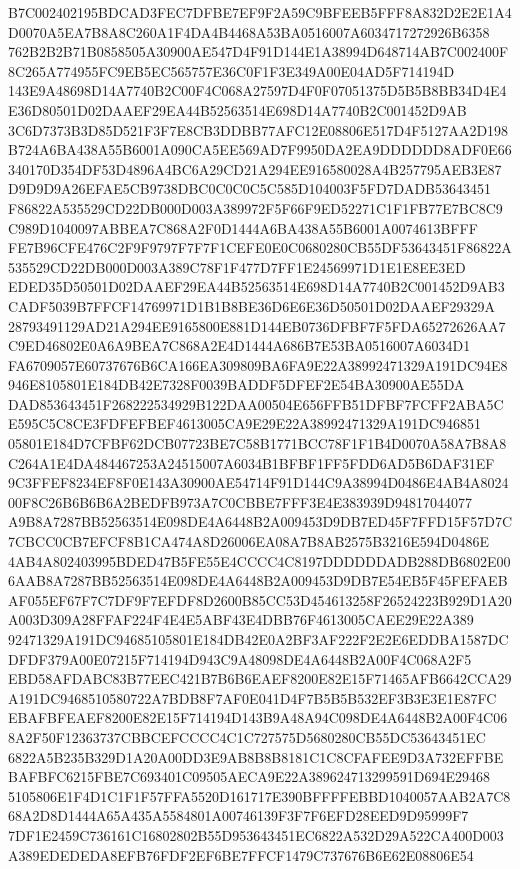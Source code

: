 \documentclass[UTF8,fontset=fandol,zihao=-4,a4paper]{ctexart}
\begin{document}
{{B7C002402195BDCAD3FEC7DFBE7EF9F2A59C9BFEEB5FFF8A832D2E2E1A4D0070A5EA7B8A8C260A1F4DA4B4468A53BA0516007A6034717272926B6358
762B2B2B71B0858505A30900AE547D4F91D144E1A38994D648714AB7C002400F8C265A774955FC9EB5EC565757E36C0F1F3E349A00E04AD5F714194D
143E9A48698D14A7740B2C00F4C068A27597D4F0F07051375D5B5B8BB34D4E4E36D80501D02DAAEF29EA44B52563514E698D14A7740B2C001452D9AB
3C6D7373B3D85D521F3F7E8CB3DDBB77AFC12E08806E517D4F5127AA2D198B724A6BA438A55B6001A090CA5EE569AD7F9950DA2EA9DDDDDD8ADF0E66
340170D354DF53D4896A4BC6A29CD21A294EE916580028A4B257795AEB3E87D9D9D9A26EFAE5CB9738DBC0C0C0C5C585D104003F5FD7DADB53643451
F86822A535529CD22DB000D003A389972F5F66F9ED52271C1F1FB77E7BC8C9C989D1040097ABBEA7C868A2F0D1444A6BA438A55B6001A0074613BFFF
FE7B96CFE476C2F9F9797F7F7F1CEFE0E0C0680280CB55DF53643451F86822A535529CD22DB000D003A389C78F1F477D7FF1E24569971D1E1E8EE3ED
EDED35D50501D02DAAEF29EA44B52563514E698D14A7740B2C001452D9AB3CADF5039B7FFCF14769971D1B1B8BE36D6E6E36D50501D02DAAEF29329A
28793491129AD21A294EE9165800E881D144EB0736DFBF7F5FDA65272626AA7C9ED46802E0A6A9BEA7C868A2E4D1444A686B7E53BA0516007A6034D1
FA6709057E60737676B6CA166EA309809BA6FA9E22A38992471329A191DC94E8946E8105801E184DB42E7328F0039BADDF5DFEF2E54BA30900AE55DA
DAD853643451F268222534929B122DAA00504E656FFB51DFBF7FCFF2ABA5CE595C5C8CE3FDFEFBEF4613005CA9E29E22A38992471329A191DC946851
05801E184D7CFBF62DCB07723BE7C58B1771BCC78F1F1B4D0070A58A7B8A8C264A1E4DA484467253A24515007A6034B1BFBF1FF5FDD6AD5B6DAF31EF
9C3FFEF8234EF8F0E143A30900AE54714F91D144C9A38994D0486E4AB4A802400F8C26B6B6B6A2BEDFB973A7C0CBBE7FFF3E4E383939D94817044077
A9B8A7287BB52563514E098DE4A6448B2A009453D9DB7ED45F7FFD15F57D7C7CBCC0CB7EFCF8B1CA474A8D26006EA08A7B8AB2575B3216E594D0486E
4AB4A802403995BDED47B5FE55E4CCCC4C8197DDDDDDADB288DB6802E006AAB8A7287BB52563514E098DE4A6448B2A009453D9DB7E54EB5F45FEFAEB
AF055EF67F7C7DF9F7EFDF8D2600B85CC53D454613258F26524223B929D1A20A003D309A28FFAF224F4E4E5ABF43E4DBB76F4613005CAEE29E22A389
92471329A191DC94685105801E184DB42E0A2BF3AF222F2E2E6EDDBA1587DCDFDF379A00E07215F714194D943C9A48098DE4A6448B2A00F4C068A2F5
EBD58AFDABC83B77EEC421B7B6B6EAEF8200E82E15F71465AFB6642CCA29A191DC9468510580722A7BDB8F7AF0E041D4F7B5B5B532EF3B3E3E1E87FC
EBAFBFEAEF8200E82E15F714194D143B9A48A94C098DE4A6448B2A00F4C068A2F50F12363737CBBCEFCCCC4C1C727575D5680280CB55DC53643451EC
6822A5B235B329D1A20A00DD3E9AB8B8B8181C1C8CFAFEE9D3A732EFFBEBAFBFC6215FBE7C693401C09505AECA9E22A389624713299591D694E29468
5105806E1F4D1C1F1F57FFA5520D161717E390BFFFFEBBD1040057AAB2A7C868A2D8D1444A65A435A5584801A00746139F3F7F6EFD28EED9D95999F7
7DF1E2459C736161C16802802B55D953643451EC6822A532D29A522CA400D003A389EDEDEDA8EFB76FDF2EF6BE7FFCF1479C737676B6E62E08806E54
}}
\end{document}
